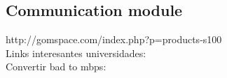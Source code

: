 \subsection{Communication module}


http://gomspace.com/index.php?p=products-s100
\\
Links interesantes universidades:
\\


Convertir bad to mbps: %

